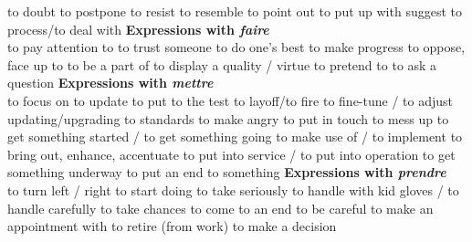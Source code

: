    {to doubt}
   {to postpone}
   {to resist}
   {to resemble}
   {to point out}
   {to put up with}
   {suggest}
   {to process/to deal with}
     {\bf Expressions with {\em faire}}\\
        {to pay attention to}
        {to trust someone}
        {     to do one’s best}
        {     to make progress}
        {     to oppose, face up to}
        {     to be a part of}
        {     to display a quality / virtue}
        {     to pretend to}
        {     to ask a question}
     {\bf Expressions with {\em mettre}}\\
        {to focus on}
        {to update}
        {to put to the test}
        {to layoff/to fire}
        {to fine-tune / to adjust}
      {updating/upgrading to standards}
        {to make angry}
        {to put in touch}
        {to mess up}
        {to get something started / to get something going}
        {to make use of / to implement}
        {to bring out, enhance, accentuate}
        {to put into service / to put into operation}
        {to get something underway}
        {to put an end to something}
     {\bf Expressions with {\em prendre}}\\
        {     to turn left / right}
        {to start doing}
        {     to take seriously}
        {to handle with kid gloves / to handle carefully}
        {     to take chances}
        {     to come to an end}
        {to be careful}
        {     to make an appointment with}
        {     to retire (from work)}
        {     to make a decision}

